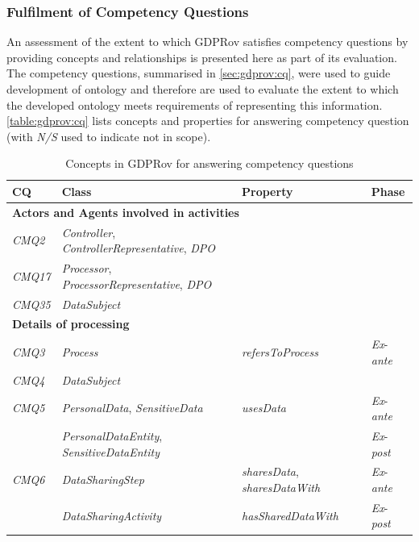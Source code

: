 \subsubsection{Fulfilment of Competency Questions}
An assessment of the extent to which GDPRov satisfies competency questions by providing concepts and relationships is presented here as part of its evaluation.
The competency questions, summarised in \autoref{sec:gdprov:cq}, were used to guide development of ontology and therefore are used to evaluate the extent to which the developed ontology meets requirements of representing this information.
\autoref{table:gdprov:cq} lists concepts and properties for answering competency question (with \textit{N/S} used to indicate not in scope).
\begin{table}[htbp]
\footnotesize
\centering
{}
\begin{tabularx}{\linewidth}{|l|X|p{5cm}|l|}
\caption{Concepts in GDPRov for answering competency questions} \\ \hline
\label{table:gdprov:cq}
\textbf{CQ} & \textbf{Class} & \textbf{Property} & \textbf{Phase} \\ \hline
\multicolumn{4}{|l|}{\textbf{Actors and Agents involved in activities}}  \\ \hline
\textit{CMQ2} & \textit{Controller}, \textit{ControllerRepresentative}, \textit{DPO} &  &  \\ \hline
\textit{CMQ17} & \textit{Processor}, \textit{ProcessorRepresentative}, \textit{DPO} &  &  \\ \hline
\textit{CMQ35} & \textit{DataSubject} &  &  \\ \hline
\multicolumn{4}{|l|}{\textbf{Details of processing}}  \\ \hline
\textit{CMQ3} & \textit{Process} & \textit{refersToProcess} & \textit{Ex}-\textit{ante} \\ \hline
\textit{CMQ4} & \textit{DataSubject} &  &  \\ \hline
\textit{CMQ5} & \textit{PersonalData}, \textit{SensitiveData} & \textit{usesData} & \textit{Ex}-\textit{ante} \\ \hline
 & \textit{PersonalDataEntity}, \textit{SensitiveDataEntity} &  & \textit{Ex}-\textit{post} \\ \hline
\textit{CMQ6} & \textit{DataSharingStep} & \textit{sharesData}, \textit{sharesDataWith} & \textit{Ex}-\textit{ante} \\ \hline
 & \textit{DataSharingActivity} & \textit{hasSharedDataWith} & \textit{Ex}-\textit{post} \\ \hline

\end{tabularx}
\end{table}

